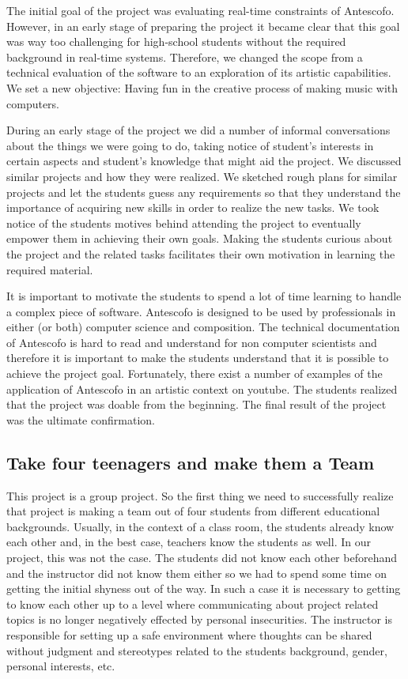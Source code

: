 \documentclass[onecolumn,nocopyrightspace,preprint]{sigplanconf}
\begin{document}
The initial goal of the project was evaluating real-time constraints of
Antescofo. However, in an early stage of preparing the project it became clear
that this goal was way too challenging for high-school students without the
required background in real-time systems. Therefore, we changed the scope from
a technical evaluation of the software to an exploration of its artistic
capabilities. We set a new objective: Having fun in the creative process of
making music with computers.

During an early stage of the project we did a number of informal conversations
about the things we were going to do, taking notice of student's interests in
certain aspects and student's knowledge that might aid the project. We discussed
similar projects and how they were realized. We sketched rough plans for similar
projects and let the students guess any requirements so that they understand
the importance of acquiring new skills in order to realize the new tasks. We
took notice of the students motives behind attending the project to eventually
empower them in achieving their own goals. Making the students curious about the
project and the related tasks facilitates their own motivation in learning the
required material.

It is important to motivate the students to spend a lot of time learning to
handle a complex piece of software. Antescofo is designed to be used by
professionals in either (or both) computer science and composition. The
technical documentation of Antescofo is hard to read and understand for non
computer scientists and therefore it is important to make the students
understand that it is possible to achieve the project goal. Fortunately, there
exist a number of examples of the application of Antescofo in an artistic
context on youtube. The students realized that the project was doable from the
beginning. The final result of the project was the ultimate confirmation.

\subsection{Take four teenagers and make them a Team}\label{sec:team}

This project is a group project. So the first thing we need to successfully
realize that project is making a team out of four students from different
educational backgrounds. Usually, in the context of a class room, the students
already know each other and, in the best case, teachers know the students as
well. In our project, this was not the case. The students did not know each
other beforehand and the instructor did not know them either so we had to
spend some time on getting the initial shyness out of the way.
In such a case it is necessary to getting to know each other up to a level
where communicating about project related topics is no longer negatively
effected by personal insecurities. The instructor is responsible for setting
up a safe environment where thoughts can be shared without judgment and
stereotypes related to the students background, gender, personal interests, etc.
\end{document}
